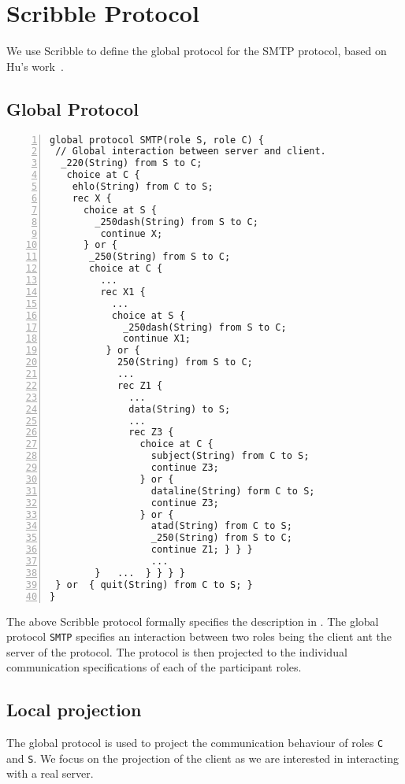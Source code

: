 \section{Scribble Protocol}
\label{sec: smtp_scribble}

We use Scribble to define the global
protocol for the SMTP protocol, based
on Hu's work~\cite{HuR:smtp}.

\subsection{Global Protocol}
\label{sec: smtp_global}

%
\begin{lstlisting}[numbers=left]
global protocol SMTP(role S, role C) {
 // Global interaction between server and client.
  _220(String) from S to C;
   choice at C {
    ehlo(String) from C to S;
    rec X {
      choice at S {
        _250dash(String) from S to C;
         continue X;
      } or {
       _250(String) from S to C;
       choice at C {
         ...
         rec X1 {
           ...
           choice at S {
             _250dash(String) from S to C;
             continue X1;
          } or {
            250(String) from S to C;
            ...
            rec Z1 {
              ...
              data(String) to S;
              ...
              rec Z3 {
                choice at C {
                  subject(String) from C to S;
                  continue Z3;
                } or {
                  dataline(String) form C to S;
                  continue Z3;
                } or {
                  atad(String) from C to S;
                  _250(String) from S to C;
                  continue Z1; } } }
                  ...
        }   ...  } } } }
 } or  { quit(String) from C to S; }
}
\end{lstlisting}


The above Scribble protocol formally specifies
the description in .
The global protocol \lstinline|SMTP| specifies
an interaction between two roles being the client ant the server of the protocol.
The protocol is then projected to the
individual communication specifications of each 
of the participant roles.


\subsection{Local projection}
\label{subsec: smtp_local}

The global protocol is used to project the communication
behaviour of roles \lstinline|C| and \lstinline|S|.
We focus on the projection of the client as we are interested in interacting with a real server.

